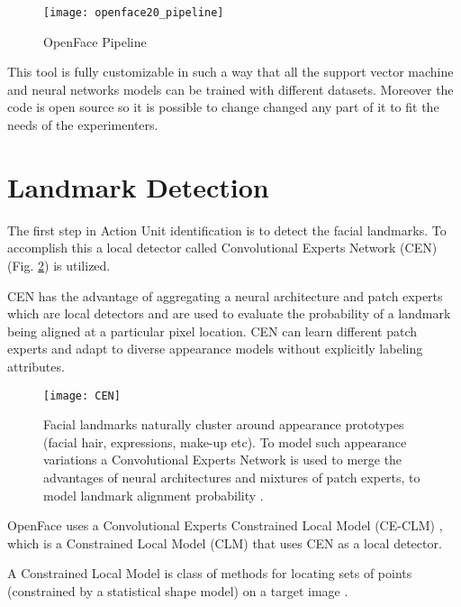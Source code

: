 \begin{figure}[H]
	\centering
	\texttt{[image: openface20\_pipeline]}
	\caption{OpenFace Pipeline \cite{Baltru2018}}
	\label{fig:openface20_pipeline}
\end{figure}

This tool is fully customizable in such a way that all the support vector machine and neural networks models can be trained with different datasets. Moreover the code is open source so it is possible to change changed any part of it to fit the needs of the experimenters.



\clearpage

\section{Landmark Detection} \label{landmark_det}

The first step in Action Unit identification is to detect the facial landmarks. To accomplish this a local detector called Convolutional Experts Network (CEN) (Fig. \ref{fig:CEN}) is utilized. 

CEN has the advantage of aggregating a neural architecture and patch experts which are local detectors and are used to evaluate the probability of a landmark being aligned at a particular pixel location. CEN can learn different patch experts and adapt to diverse appearance models without explicitly labeling attributes.

\begin{figure}[H]
	\centering
	\texttt{[image: CEN]}
	\caption{Facial landmarks naturally cluster around appearance prototypes (facial hair, expressions, make-up etc). To model such appearance variations a Convolutional Experts Network is used to merge the advantages of neural architectures and mixtures of patch experts, to model landmark alignment probability \cite{Baltru2017}.}
	\label{fig:CEN}
\end{figure}

OpenFace uses a Convolutional Experts Constrained Local Model (CE-CLM) \cite{Baltru2017}, which is a Constrained Local Model (CLM) that uses CEN as a local detector. 

A Constrained Local Model is class of methods for locating sets of points (constrained by a statistical shape model) on a target image \cite{clm_cootes}.

